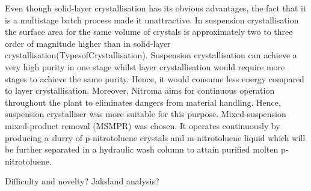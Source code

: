 Even though solid-layer crystallisation has its obvious advantages, the fact that it is a multistage batch process made it unattractive. In suspension crystallisation the surface area for the same volume of crystals is approximately two to three order of magnitude higher than in solid-layer crystallisation(TypesofCrystallisation). Suspension crystallisation can achieve a very high purity in one stage whilst layer crystallisation would require more stages to achieve the same purity. Hence, it would consume less energy compared to layer crystallisation. Moreover, Nitroma aims for continuous operation throughout the plant to eliminates dangers from material handling. Hence, suspension crystalliser was more suitable for this purpose. Mixed-suspension mixed-product removal (MSMPR) was chosen. It operates continuously by producing a slurry of p-nitrotoluene crystals and m-nitrotoluene liquid which will be further separated in a hydraulic wash column to attain purified molten p-nitrotoluene. 

Difficulty and novelty? 
Jaksland analysis?

